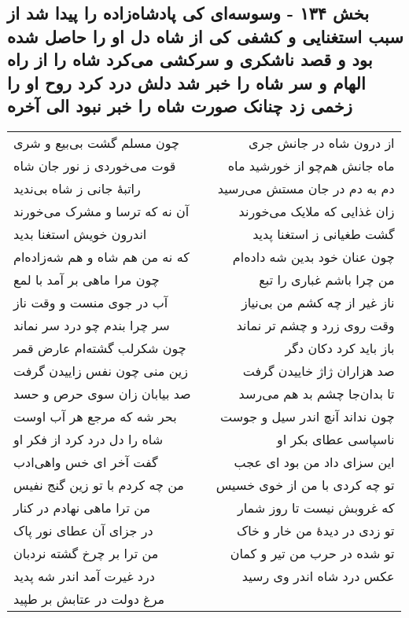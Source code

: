 \begin{center}
\section*{بخش ۱۳۴ - وسوسه‌ای کی پادشاه‌زاده را پیدا شد از سبب استغنایی و کشفی کی از شاه دل او را حاصل شده بود و قصد ناشکری و سرکشی می‌کرد شاه را از راه الهام و سر شاه را خبر شد دلش درد کرد روح او را زخمی زد چنانک صورت شاه را خبر نبود الی آخره}
\label{sec:sh134}
\begin{longtable}{l p{0.5cm} r}
چون مسلم گشت بی‌بیع و شری
&&
از درون شاه در جانش جری
\\
قوت می‌خوردی ز نور جان شاه
&&
ماه جانش هم‌چو از خورشید ماه
\\
راتبهٔ جانی ز شاه بی‌ندید
&&
دم به دم در جان مستش می‌رسید
\\
آن نه که ترسا و مشرک می‌خورند
&&
زان غذایی که ملایک می‌خورند
\\
اندرون خویش استغنا بدید
&&
گشت طغیانی ز استغنا پدید
\\
که نه من هم شاه و هم شه‌زاده‌ام
&&
چون عنان خود بدین شه داده‌ام
\\
چون مرا ماهی بر آمد با لمع
&&
من چرا باشم غباری را تبع
\\
آب در جوی منست و وقت ناز
&&
ناز غیر از چه کشم من بی‌نیاز
\\
سر چرا بندم چو درد سر نماند
&&
وقت روی زرد و چشم تر نماند
\\
چون شکرلب گشته‌ام عارض قمر
&&
باز باید کرد دکان دگر
\\
زین منی چون نفس زاییدن گرفت
&&
صد هزاران ژاژ خاییدن گرفت
\\
صد بیابان زان سوی حرص و حسد
&&
تا بدان‌جا چشم بد هم می‌رسد
\\
بحر شه که مرجع هر آب اوست
&&
چون نداند آنچ اندر سیل و جوست
\\
شاه را دل درد کرد از فکر او
&&
ناسپاسی عطای بکر او
\\
گفت آخر ای خس واهی‌ادب
&&
این سزای داد من بود ای عجب
\\
من چه کردم با تو زین گنج نفیس
&&
تو چه کردی با من از خوی خسیس
\\
من ترا ماهی نهادم در کنار
&&
که غروبش نیست تا روز شمار
\\
در جزای آن عطای نور پاک
&&
تو زدی در دیدهٔ من خار و خاک
\\
من ترا بر چرخ گشته نردبان
&&
تو شده در حرب من تیر و کمان
\\
درد غیرت آمد اندر شه پدید
&&
عکس درد شاه اندر وی رسید
\\
مرغ دولت در عتابش بر طپید

\end{longtable}
\end{center}
